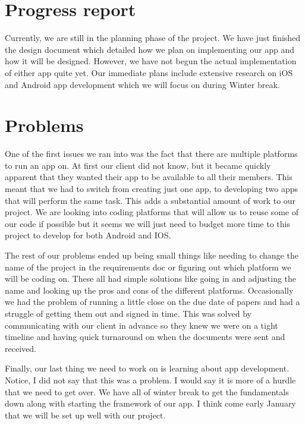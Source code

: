 \documentclass[letterpaper,10pt,draftclsnofoot,onecolumn,titlepage]{IEEEtran}
\begin{document}
		\section{Progress report}
		Currently, we are still in the planning phase of the project. 
		We have just finished the design document which detailed how we plan on implementing our app and how it will be designed. 
		However, we have not begun the actual implementation of either app quite yet. 
		Our immediate plans include extensive research on iOS and Android app development which we will focus on during Winter break. 
		

		\section{Problems}
		One of the first issues we ran into was the fact that there are multiple platforms to run an app on. 
		At first our client did not know, but it became quickly apparent that they wanted their app to be available to all their members. 
		This meant that we had to switch from creating just one app, to developing two apps that will perform the same task. This adds a substantial amount of work to our project. 
		We are looking into coding platforms that will allow us to reuse some of our code if possible but it seems we will just need to budget more time to this project to develop for both Android and IOS. 

	The rest of our problems ended up being small things like needing to change the name of the project in the requirements doc or figuring out which platform we will be coding on. 
	These all had simple solutions like going in and adjusting the name and looking up the pros and cons of the different platforms. 
	Occasionally we had the problem of running a little close on the due date of papers and had a struggle of getting them out and signed in time. 
	This was solved by communicating with our client in advance so they knew we were on a tight timeline and having quick turnaround on when the documents were sent and received. 

	Finally, our last thing we need to work on is learning about app development. 
	Notice, I did not say that this was a problem. 
	I would say it is more of a hurdle that we need to get over. 
	We have all of winter break to get the fundamentals down along with starting the framework of our app. 
	I think come early January that we will be set up well with our project. 
\end{document}
